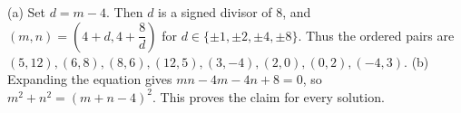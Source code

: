 (a) Set $d=m-4$. Then $d$ is a signed divisor of $8$, and $(m,n)=(4+d,4+\dfrac{8}{d})$ for $d\in\{\pm1,\pm2,\pm4,\pm8\}$. Thus the ordered pairs are $(5,12),(6,8),(8,6),(12,5),(3,-4),(2,0),(0,2),(-4,3)$. (b) Expanding the equation gives $mn-4m-4n+8=0$, so $m^2+n^2=(m+n-4)^2$. This proves the claim for every solution.
